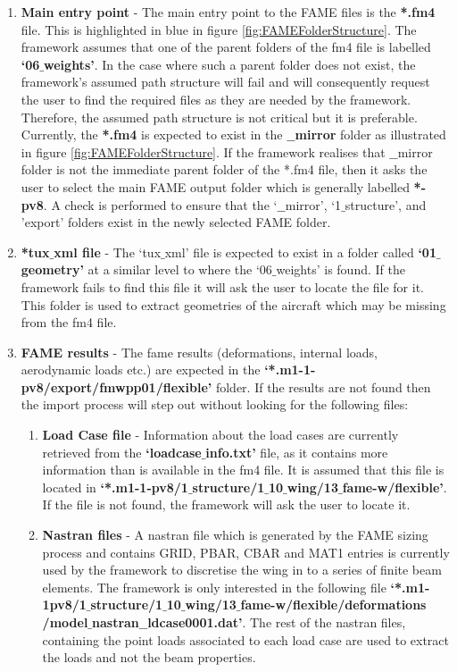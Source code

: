 \begin{enumerate}
	\item \textbf{Main entry point} - The main entry point to the FAME files is the \textbf{*.fm4} file. This is highlighted in blue in figure \ref{fig:FAMEFolderStructure}. The framework assumes that one of the parent folders of the fm4 file is labelled \textbf{`06$\_$weights'}. In the case where such a parent folder does not exist, the framework's assumed path structure will fail and will consequently request the user to find the required files as they are needed by the framework. Therefore, the assumed path structure is not critical but it is preferable. Currently, the \textbf{*.fm4} is expected to exist in the \textbf{$\_\_$mirror} folder as illustrated in figure \ref{fig:FAMEFolderStructure}. If the framework realises that $\_\_$mirror folder is not the immediate parent folder of the *.fm4 file, then it asks the user to select the main FAME output folder which is generally labelled \textbf{*-pv8}. A check is performed to ensure that the `$\_\_$mirror', `1$\_$structure', and 'export' folders exist in the newly selected FAME folder.
	\item \textbf{*tux$\_$xml file} - The `tux$\_$xml' file is expected to exist in a folder called \textbf{`01$\_$geometry'} at a similar level to where the `06$\_$weights' is found. If the framework fails to find this file it will ask the user to locate the file for it. This folder is used to extract geometries of the aircraft which may be missing from the fm4 file.
	\item \textbf{FAME results} - The fame results (deformations, internal loads, aerodynamic loads etc.) are expected in the \textbf{`*.m1-1-pv8/export/fmwpp01/flexible'} folder. If the results are not found then the import process will step out without looking for the following files:
	\begin{enumerate}	
		\item \textbf{Load Case file} - Information about the load cases are currently retrieved from the \textbf{`loadcase$\_$info.txt'} file, as it contains more information than is available in the fm4 file. It is assumed that this file is located in \textbf{`*.m1-1-pv8/1$\_$structure/1$\_$10$\_$wing/13$\_$fame-w/flexible'}. If the file is not found, the framework will ask the user to locate it.
		\item \textbf{Nastran files} - A nastran file which is generated by the FAME sizing process and contains GRID, PBAR, CBAR and MAT1 entries is currently used by the framework to discretise the wing in to a series of finite beam elements. The framework is only interested in the following file \textbf{`*.m1-1pv8/1$\_$structure/1$\_$10$\_$wing/13$\_$fame-w/flexible/deformations /model$\_$nastran$\_\_$ldcase0001.dat'}. The rest of the nastran files, containing the point loads associated to each load case are used to extract the loads and not the beam properties.

\end{enumerate}
\end{enumerate}
